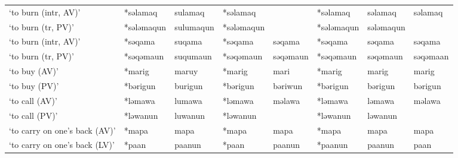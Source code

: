 \begin{landscape}
\begin{longtable}[c]{@{}p{3cm}<{\raggedright}p{2.75cm}<{\raggedright}p{2.75cm}<{\raggedright}p{2.75cm}<{\raggedright}p{2.75cm}<{\raggedright}p{2.75cm}<{\raggedright}p{2.75cm}<{\raggedright}p{2.75cm}<{\raggedright}@{}}
`to burn (intr, AV)'                                 & *səlamaq           & sulamaq                        & *səlamaq           &                            & *səlamaq         & səlamaq                  & səlamaq                           \\
`to burn (tr, PV)'                                   & *sələmaqun         & sulumaqun                      & *sələmaqun         &                            & *sələmaqun       & sələmaqun                &                                   \\
`to burn (intr, AV)'                                 & *səqama            & suqama                         & *səqama            & səqama                     & *səqama          & səqama                   & səqama                            \\
`to burn (tr, PV)'                                   & *səqəmaun          & suqumaun                       & *səqəmaun          & səqəmaun                   & *səqəmaun        & səqəmaun                 & səqəmaan                          \\
`to buy (AV)'                                        & *marig             & maruy                          & *marig             & mari                       & *marig           & marig                    & marig                             \\
`to buy (PV)'                                        & *bərigun           & burigun                        & *bərigun           & bəriwun                    & *bərigun         & bərigun                  & bərigun                           \\
`to call (AV)'                                       & *ləmawa            & lumawa                         & *ləmawa            & məlawa                     & *ləmawa          & ləmawa                   & məlawa                            \\
`to call (PV)'                                       & *ləwanun           & luwanun                        & *ləwanun           &                            & *ləwanun         & ləwanun                  &                                   \\
`to carry on one's back (AV)'                        & *mapa              & mapa                           & *mapa              & mapa                       & *mapa            & mapa                     & mapa                              \\
`to carry on one's back (LV)'                        & *paan              & paanun                         & *paan              & paanun                     & *paanun          & paanun                   & paan                              \\

\end{longtable}
\end{landscape}
